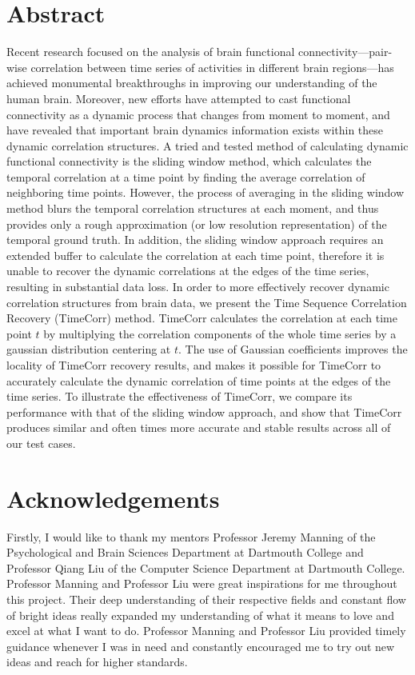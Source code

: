 \documentclass[11pt]{article}
\begin{document}
\section{Abstract}
Recent research focused on the analysis of brain functional connectivity---pair-wise correlation between time series of activities in different brain regions---has achieved monumental breakthroughs in improving our understanding of the human brain. Moreover, new efforts have attempted to cast functional connectivity as a dynamic process that changes from moment to moment, and have revealed that important brain dynamics information exists within these dynamic correlation structures. A tried and tested method of calculating dynamic functional connectivity is the sliding window method, which calculates the temporal correlation at a time point by finding the average correlation of neighboring time points. However, the process of averaging in the sliding window method blurs the temporal correlation structures at each moment, and thus provides only a rough approximation (or low resolution representation) of the temporal ground truth. In addition, the sliding window approach requires an extended buffer to calculate the correlation at each time point, therefore it is unable to recover the dynamic correlations at the edges of the time series, resulting in substantial data loss. In order to more effectively recover dynamic correlation structures from brain data, we present the Time Sequence Correlation Recovery (TimeCorr) method. TimeCorr calculates the correlation at each time point $t$ by multiplying the correlation components of the whole time series by a gaussian distribution centering at $t$. The use of Gaussian coefficients improves the locality of TimeCorr recovery results, and makes it possible for TimeCorr to accurately calculate the dynamic correlation of time points at the edges of the time series. To illustrate the effectiveness of TimeCorr, we compare its performance with that of the sliding window approach, and show that TimeCorr produces similar and often times more accurate and stable results across all of our test cases.

\newpage
\section{Acknowledgements}
Firstly, I would like to thank my mentors Professor Jeremy Manning of the Psychological and Brain Sciences Department at Dartmouth College and Professor Qiang Liu of the Computer Science Department at Dartmouth College. Professor Manning and Professor Liu were great inspirations for me throughout this project. Their deep understanding of their respective fields and constant flow of bright ideas really expanded my understanding of what it means to love and excel at what I want to do. Professor Manning and Professor Liu provided timely guidance whenever I was in need and constantly encouraged me to try out new ideas and reach for higher standards.
\end{document}
